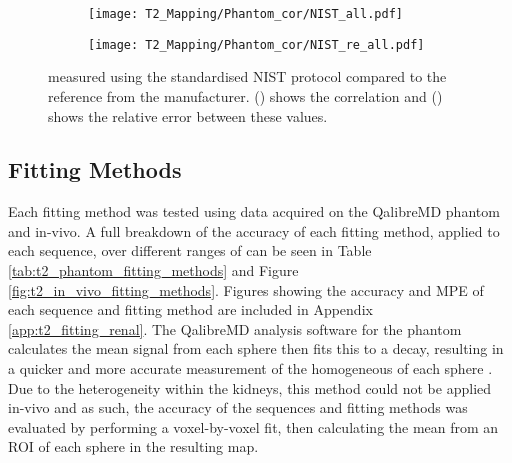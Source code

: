 \begin{figure}[H]
	\centering
	\begin{subfigure}[c]{0.47\textwidth}
		\centering
		\texttt{[image: T2\_Mapping/Phantom\_cor/NIST\_all.pdf]}
		\caption{}
		\label{fig:t2_nist_cor}
	\end{subfigure}
	\hfill
	\begin{subfigure}[c]{0.47\textwidth}
		\centering
		\texttt{[image: T2\_Mapping/Phantom\_cor/NIST\_re\_all.pdf]}
		\caption{}
		\label{fig:t2_nist_re}
	\end{subfigure}
	\caption{\ttwo measured using the standardised \ac{NIST} protocol compared to the reference \ttwo from the manufacturer. () shows the correlation and () shows the relative error between these values.}
	\label{fig:t2_nist}
\end{figure}
\subsection{Fitting Methods}
\label{subsec:t2_fitting_methods_results}
Each fitting method was tested using data acquired on the QalibreMD phantom and in-vivo. A full breakdown of the accuracy of each fitting method, applied to each sequence, over different ranges of \ttwo can be seen in Table \ref{tab:t2_phantom_fitting_methods} and Figure \ref{fig:t2_in_vivo_fitting_methods}. Figures showing the accuracy and \ac{MPE} of each sequence and fitting method are included in Appendix \ref{app:t2_fitting_renal}. The QalibreMD analysis software for the phantom calculates the mean signal from each sphere then fits this to a \ttwo decay, resulting in a quicker and more accurate measurement of the homogeneous \ttwo of each sphere \cite{mristandards_mristandardsphantomviewer_2020}. Due to the heterogeneity within the kidneys, this method could not be applied in-vivo and as such, the accuracy of the sequences and fitting methods was evaluated by performing a voxel-by-voxel fit, then calculating the mean \ttwo from an \ac{ROI} of each sphere in the resulting map.

